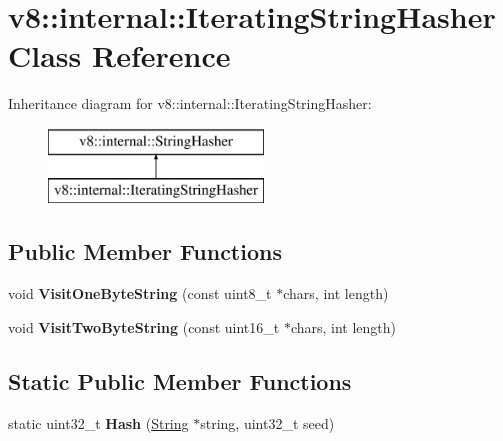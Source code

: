 \hypertarget{classv8_1_1internal_1_1_iterating_string_hasher}{}\section{v8\+:\+:internal\+:\+:Iterating\+String\+Hasher Class Reference}
\label{classv8_1_1internal_1_1_iterating_string_hasher}
Inheritance diagram for v8\+:\+:internal\+:\+:Iterating\+String\+Hasher\+:\begin{figure}[H]
\begin{center}
\leavevmode
\includegraphics[height=2.000000cm]{classv8_1_1internal_1_1_iterating_string_hasher}
\end{center}
\end{figure}
\subsection*{Public Member Functions}
\begin{DoxyCompactItemize}
\item 
void {\bfseries Visit\+One\+Byte\+String} (const uint8\+\_\+t $\ast$chars, int length)\hypertarget{classv8_1_1internal_1_1_iterating_string_hasher_a7be677eeced4b534a8f4b19a68fae449}{}\label{classv8_1_1internal_1_1_iterating_string_hasher_a7be677eeced4b534a8f4b19a68fae449}

\item 
void {\bfseries Visit\+Two\+Byte\+String} (const uint16\+\_\+t $\ast$chars, int length)\hypertarget{classv8_1_1internal_1_1_iterating_string_hasher_a77569d7793ecc1e6c6b5a7286f96857d}{}\label{classv8_1_1internal_1_1_iterating_string_hasher_a77569d7793ecc1e6c6b5a7286f96857d}

\end{DoxyCompactItemize}
\subsection*{Static Public Member Functions}
\begin{DoxyCompactItemize}
\item 
static uint32\+\_\+t {\bfseries Hash} (\hyperlink{classv8_1_1internal_1_1_string}{String} $\ast$string, uint32\+\_\+t seed)\hypertarget{classv8_1_1internal_1_1_iterating_string_hasher_ad00dd25dd53b39583342e52494c251ae}{}\label{classv8_1_1internal_1_1_iterating_string_hasher_ad00dd25dd53b39583342e52494c251ae}

\end{DoxyCompactItemize}
